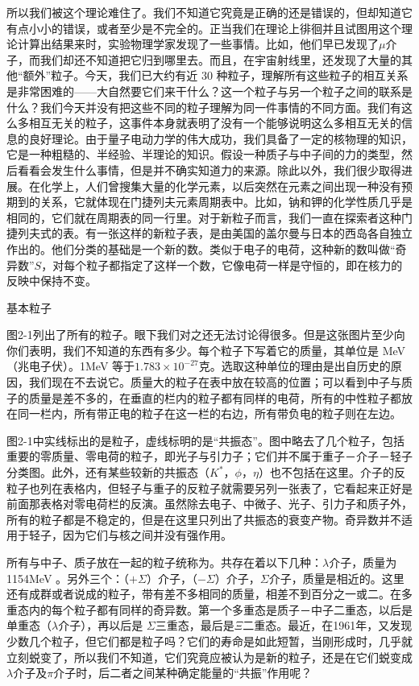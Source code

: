 \documentclass[12pt,oneside]{book}
\begin{document}
\begin{common-format}
所以我们被这个理论难住了。我们不知道它究竟是正确的还是错误的，但却知道它有点小小的错误，或者至少是不完全的。正当我们在理论上徘徊并且试图用这个理论计算出结果来时，实验物理学家发现了一些事情。比如，他们早已发现了$\mu$介子，而我们却还不知道把它归到哪里去。而且，在宇宙射线里，还发现了大量的其他“额外”粒子。今天，我们已大约有近 30 种粒子，理解所有这些粒子的相互关系是非常困难的——大自然要它们来干什么？这一个粒子与另一个粒子之间的联系是什么？我们今天并没有把这些不同的粒子理解为同一件事情的不同方面。我们有这么多相互无关的粒子，这事件本身就表明了没有一个能够说明这么多相互无关的信息的良好理论。由于量子电动力学的伟大成功，我们具备了一定的核物理的知识，它是一种粗糙的、半经验、半理论的知识。假设一种质子与中子间的力的类型，然后看看会发生什么事情，但是并不确实知道力的来源。除此以外，我们很少取得进展。在化学上，人们曾搜集大量的化学元素，以后突然在元素之间出现一种没有预期到的关系，它就体现在门捷列夫元素周期表中。比如，钠和钾的化学性质几乎是相同的，它们就在周期表的同一行里。对于新粒子而言，我们一直在探索者这种门捷列夫式的表。有一张这样的新粒子表，是由美国的盖尔曼与日本的西岛各自独立作出的。他们分类的基础是一个新的数。类似于电子的电荷，这种新的数叫做“奇异数”$S$，对每个粒子都指定了这样一个数，它像电荷一样是守恒的，即在核力的反映中保持不变。
\begin{linefig}{基本粒子}
\caption{基本粒子}
\label{fig:基本粒子}
\end{linefig}
图2-1列出了所有的粒子。眼下我们对之还无法讨论得很多。但是这张图片至少向你们表明，我们不知道的东西有多少。每个粒子下写着它的质量，其单位是 MeV（兆电子伏）。1MeV 等于$ 1.783\times10^{-27} $克。选取这种单位的理由是出自历史的原因，我们现在不去说它。质量大的粒子在表中放在较高的位置；可以看到中子与质子的质量是差不多的，在垂直的栏内的粒子都有同样的电荷，所有的中性粒子都放在同一栏内，所有带正电的粒子在这一栏的右边，所有带负电的粒子则在左边。

图2-1中实线标出的是粒子，虚线标明的是“共振态”。图中略去了几个粒子，包括重要的零质量、零电荷的粒子，即光子与引力子；它们并不属于重子－介子－轻子分类图。此外，还有某些较新的共振态（$K^*$，$\phi$，$\eta$）也不包括在这里。介子的反粒子也列在表格内，但轻子与重子的反粒子就需要另列一张表了，它看起来正好是前面那表格对零电荷栏的反演。虽然除去电子、中微子、光子、引力子和质子外，所有的粒子都是不稳定的，但是在这里只列出了共振态的衰变产物。奇异数并不适用于轻子，因为它们与核之间并没有强作用。

所有与中子、质子放在一起的粒子统称为。共存在着以下几种：$\lambda$介子，质量为 1154MeV 。另外三个：（$ +\Sigma $）介子，（$ -\Sigma $）介子，$ \Sigma $介子，质量是相近的。这里还有成群或者说成的粒子，带有差不多相同的质量，相差不到百分之一或二。在多重态内的每个粒子都有同样的奇异数。第一个多重态是质子－中子二重态，以后是单重态（$\lambda$介子），再以后是 $ \Sigma $三重态，最后是$ \Xi $二重态。最近，在1961年，又发现少数几个粒子，但它们都是粒子吗？它们的寿命是如此短暂，当刚形成时，几乎就立刻蜕变了，所以我们不知道，它们究竟应被认为是新的粒子，还是在它们蜕变成$\lambda$介子及$\pi$介子时，后二者之间某种确定能量的“共振”作用呢？


\end{common-format}
\end{document}

